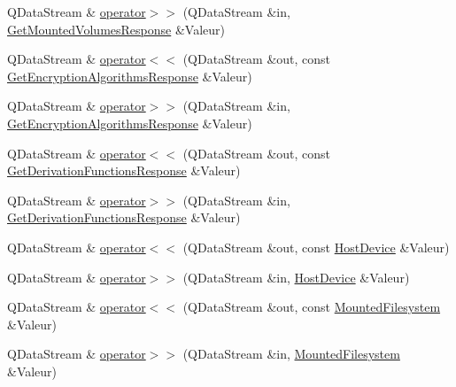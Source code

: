 \begin{DoxyCompactItemize}
Q\+Data\+Stream \& \hyperlink{namespace_gost_crypt_1_1_core_a239ed003024a9c505cb3cb08bd8724d6}{operator$>$$>$} (Q\+Data\+Stream \&in, \hyperlink{struct_gost_crypt_1_1_core_1_1_get_mounted_volumes_response}{Get\+Mounted\+Volumes\+Response} \&Valeur)
\item 
Q\+Data\+Stream \& \hyperlink{namespace_gost_crypt_1_1_core_ae57484e6c6e6ca8d7b22ed5167e65fb7}{operator$<$$<$} (Q\+Data\+Stream \&out, const \hyperlink{struct_gost_crypt_1_1_core_1_1_get_encryption_algorithms_response}{Get\+Encryption\+Algorithms\+Response} \&Valeur)
\item 
Q\+Data\+Stream \& \hyperlink{namespace_gost_crypt_1_1_core_a94e510b6aff526804cc4fceba10f7157}{operator$>$$>$} (Q\+Data\+Stream \&in, \hyperlink{struct_gost_crypt_1_1_core_1_1_get_encryption_algorithms_response}{Get\+Encryption\+Algorithms\+Response} \&Valeur)
\item 
Q\+Data\+Stream \& \hyperlink{namespace_gost_crypt_1_1_core_a70a95d0a08d31a4f97018fc16eefe3f4}{operator$<$$<$} (Q\+Data\+Stream \&out, const \hyperlink{struct_gost_crypt_1_1_core_1_1_get_derivation_functions_response}{Get\+Derivation\+Functions\+Response} \&Valeur)
\item 
Q\+Data\+Stream \& \hyperlink{namespace_gost_crypt_1_1_core_ae6407183fa1e4e8da35cc75529616661}{operator$>$$>$} (Q\+Data\+Stream \&in, \hyperlink{struct_gost_crypt_1_1_core_1_1_get_derivation_functions_response}{Get\+Derivation\+Functions\+Response} \&Valeur)
\item 
Q\+Data\+Stream \& \hyperlink{namespace_gost_crypt_1_1_core_a160514e5b1de3db29b884733543a04d0}{operator$<$$<$} (Q\+Data\+Stream \&out, const \hyperlink{struct_gost_crypt_1_1_core_1_1_host_device}{Host\+Device} \&Valeur)
\item 
Q\+Data\+Stream \& \hyperlink{namespace_gost_crypt_1_1_core_af76f2cc4a0ec25c20c63482b879c92b6}{operator$>$$>$} (Q\+Data\+Stream \&in, \hyperlink{struct_gost_crypt_1_1_core_1_1_host_device}{Host\+Device} \&Valeur)
\item 
Q\+Data\+Stream \& \hyperlink{namespace_gost_crypt_1_1_core_a9ab7e2360d2999e75a160217f9661dfb}{operator$<$$<$} (Q\+Data\+Stream \&out, const \hyperlink{struct_gost_crypt_1_1_core_1_1_mounted_filesystem}{Mounted\+Filesystem} \&Valeur)
\item 
Q\+Data\+Stream \& \hyperlink{namespace_gost_crypt_1_1_core_a5dc7c6dde9e85efd751ed4261554aaad}{operator$>$$>$} (Q\+Data\+Stream \&in, \hyperlink{struct_gost_crypt_1_1_core_1_1_mounted_filesystem}{Mounted\+Filesystem} \&Valeur)
\item 

\end{DoxyCompactItemize}
